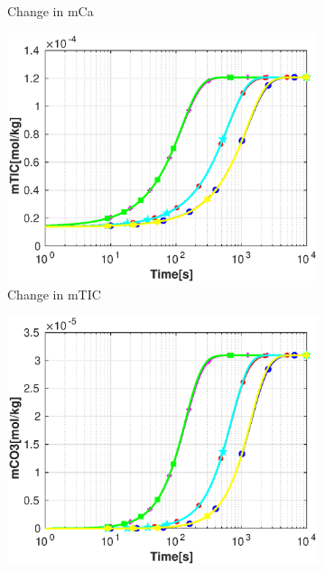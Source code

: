 \begin{figure}
\begin{subfigure}{.5\linewidth}
        \caption{\small Change in mCa}
        \label{fig:dvmpH7mCa}
    \end{subfigure}%
    \hfill
    \begin{subfigure}{.5\linewidth}
            \centering
        \includegraphics[width=\textwidth]{PICTURES/dvm_pH7_mTIC.eps}
        \caption{\small Change in mTIC}
        \label{fig:dvmpH7mTIC}
    \end{subfigure}%
    \hfill
    \begin{subfigure}{.5\linewidth}
            \centering
        \includegraphics[width=\textwidth]{PICTURES/dvm_pH7_mCO3.eps}

\end{subfigure}
\end{figure}
